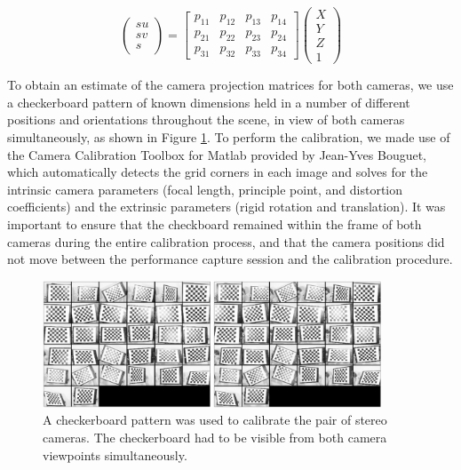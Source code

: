 \begin{equation}
\label{projection}
	\left(\!
    \begin{array}{c}
      su \\
      sv \\
      s
    \end{array}
  	\!\right) =
  \begin{bmatrix}
       p_{11} & p_{12} & p_{13} & p_{14} \\[0.3em]
       p_{21} & p_{22} & p_{23} & p_{24} \\[0.3em]
       p_{31} & p_{32} & p_{33} & p_{34}
  \end{bmatrix}
    \left(\!
    \begin{array}{c}
      X \\
      Y \\
      Z \\
      1
    \end{array}
    \!\right)
\end{equation}

To obtain an estimate of the camera projection matrices for both cameras, we use a checkerboard pattern of known dimensions held in a number of different positions and orientations throughout the scene, in view of both cameras simultaneously, as shown in Figure \ref{fig:checkerboard}. To perform the calibration, we made use of the Camera Calibration Toolbox for Matlab \cite{Calib} provided by Jean-Yves Bouguet, which automatically detects the grid corners in each image and solves for the intrinsic camera parameters (focal length, principle point, and distortion coefficients) and the extrinsic parameters (rigid rotation and translation). It was important to ensure that the checkboard remained within the frame of both cameras during the entire calibration process, and that the camera positions did not move between the performance capture session and the calibration procedure. 

\begin{figure}[htbp!]
\centering
\includegraphics[width=0.9\textwidth]{img/calib2}
	\caption{A checkerboard pattern was used to calibrate the pair of stereo cameras. The checkerboard had to be visible from both camera viewpoints simultaneously.}
	\label{fig:checkerboard}
\end{figure}

